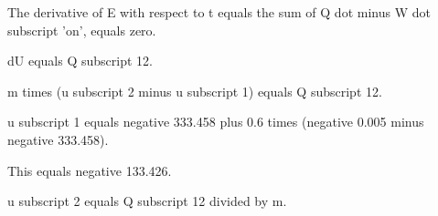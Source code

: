 The derivative of E with respect to t equals the sum of Q dot minus W dot subscript 'on', equals zero.

dU equals Q subscript 12.

m times (u subscript 2 minus u subscript 1) equals Q subscript 12.

u subscript 1 equals negative 333.458 plus 0.6 times (negative 0.005 minus negative 333.458).

This equals negative 133.426.

u subscript 2 equals Q subscript 12 divided by m.